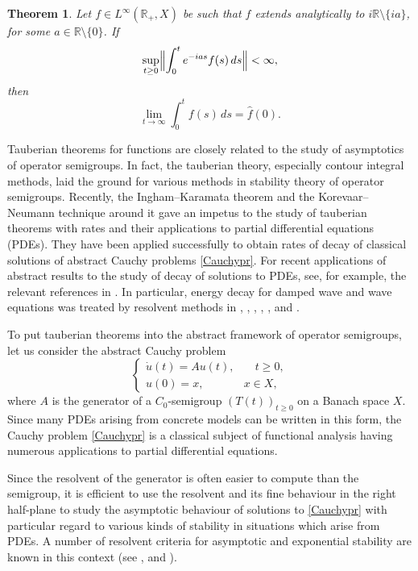 \documentclass[11pt]{amsart}
\newtheorem{theorem}{Theorem}[section]
\theoremstyle{definition}
\theoremstyle{remark}
\numberwithin{equation}{section}
\begin{document}
\begin{theorem}\label{inghamsing} Let $f \in L^{\infty}(\mathbb R_+,X)$ be such that $\widehat f$ extends analytically to $i\mathbb R\setminus\{ia\}$, for some $a \in {{\mathbb R}} \setminus \{0\}$.  If
\begin{equation*} \label{singbound}
\sup_{t \ge 0} \Bigl\|\int_{0}^{t}e^{-i a s}f(s)\, ds\Bigr\|<\infty,
\end{equation*}
then
\begin{equation} \label{singlim}
\lim_{t \to \infty} \int_{0}^{t}f(s)\, ds=\widehat f(0).
\end{equation}
\end{theorem}

Tauberian theorems for functions are closely related to the study of asymptotics of  operator semigroups. In fact, the  tauberian theory, especially contour integral methods, laid the ground for various methods in stability theory of operator semigroups. Recently, the Ingham--Karamata theorem and the Korevaar--Neumann technique around it gave an impetus to the study of tauberian theorems with rates and their applications to partial differential equations (PDEs). They have been applied successfully to obtain rates of decay of classical solutions of abstract Cauchy problems \eqref{Cauchypr}. For recent applications of abstract results to the study of decay of solutions to PDEs, see, for example, the relevant references in \cite{BaChTo13}. In particular, energy decay for damped wave and wave equations was treated by resolvent methods in
\cite{AnLe12}, \cite{Bu98}, \cite{BuHi07}, \cite{Le96},
\cite{LeRo97}, 
\cite{Ch09} and \cite{ChSchVaWu13}.

To put tauberian theorems into the abstract framework of operator semigroups,
let us consider the abstract Cauchy problem
\begin{equation}\label{Cauchypr}
\left\{ \begin{array}{ll}
\dot{u} (t) = A u(t), & \quad t \ge 0 ,\\[2mm]
u(0) = x , & x\in X,
\end{array} \right.
\end{equation}
where $A$ is the generator of a
$C_0$-semigroup $(T(t))_{t \ge 0}$ on a Banach space $X$.
Since many PDEs arising from concrete models can be written in this form, the Cauchy problem \eqref{Cauchypr}  is a classical subject
of functional analysis having numerous applications to partial
differential equations.

Since the resolvent of the generator is often easier to compute than the semigroup, it is efficient to use the resolvent and its fine behaviour in the right half-plane to study the asymptotic behaviour of solutions to \eqref{Cauchypr} with particular regard to various kinds of stability in situations which arise from PDEs. A number of resolvent criteria for asymptotic and exponential stability are known in this context (see \cite[Chapter 5]{ABHN01}, \cite{ChTo07} and \cite{Ne96}).
\end{document}
